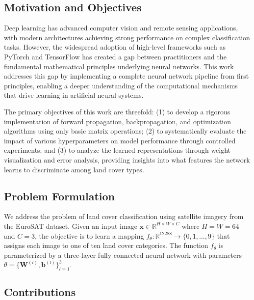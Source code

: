 \documentclass[sigconf,nonacm]{acmart}
\begin{document}
\subsection{Motivation and Objectives}

Deep learning has advanced computer vision and remote sensing applications, with modern architectures achieving strong performance on complex classification tasks. However, the widespread adoption of high-level frameworks such as PyTorch and TensorFlow has created a gap between practitioners and the fundamental mathematical principles underlying neural networks. This work addresses this gap by implementing a complete neural network pipeline from first principles, enabling a deeper understanding of the computational mechanisms that drive learning in artificial neural systems.

The primary objectives of this work are threefold: (1) to develop a rigorous implementation of forward propagation, backpropagation, and optimization algorithms using only basic matrix operations; (2) to systematically evaluate the impact of various hyperparameters on model performance through controlled experiments; and (3) to analyze the learned representations through weight visualization and error analysis, providing insights into what features the network learns to discriminate among land cover types.

\subsection{Problem Formulation}

We address the problem of land cover classification using satellite imagery from the EuroSAT dataset. Given an input image $\mathbf{x} \in \mathbb{R}^{H \times W \times C}$ where $H=W=64$ and $C=3$, the objective is to learn a mapping $f_\theta: \mathbb{R}^{12288} \rightarrow \{0, 1, \ldots, 9\}$ that assigns each image to one of ten land cover categories. The function $f_\theta$ is parameterized by a three-layer fully connected neural network with parameters $\theta = \{\mathbf{W}^{(l)}, \mathbf{b}^{(l)}\}_{l=1}^{3}$.

\subsection{Contributions}
\end{document}
